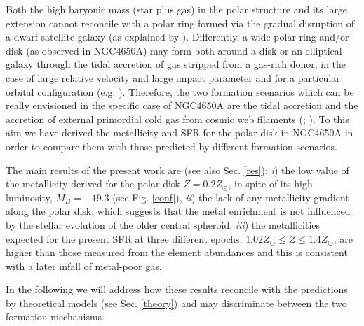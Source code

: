\documentclass[12pt,preprint]{aastex}
\begin{document}
 Both the high baryonic mass (star plus gas) in the polar structure
 and its large extension cannot reconcile with a polar ring formed via
 the gradual disruption of a dwarf satellite galaxy (as explained by
 \citealt{Iod02}).  Differently, a wide polar ring and/or disk (as
 observed in NGC4650A) may form both around a disk or an elliptical
 galaxy through the tidal accretion of gas stripped from a gas-rich
 donor, in the case of large relative velocity and large impact
 parameter and for a particular orbital configuration
 (e.g. \citealt{Bou03}).  Therefore, the two formation scenarios which
 can be really envisioned in the specific case of NGC4650A are the
 tidal accretion and the accretion of external primordial cold gas
 from cosmic web filaments (\citealt{Mac06}; \citealt{Bro08}). To this
 aim we have derived the metallicity and SFR for the polar disk in
 NGC4650A in order to compare them with those predicted by different
 formation scenarios.

The main results of the
  present work are (see also Sec. \ref{res}): \emph{i}) the low value
  of the metallicity derived for the polar disk $Z = 0.2Z_{\odot}$, in
  spite of its high luminosity, $M_{B} = -19.3$ (see Fig. \ref{conf}),
  \emph{ii}) the lack of any metallicity gradient along the polar
  disk, which suggests that the metal enrichment is not influenced by
  the stellar evolution of the older central spheroid, \emph{iii}) the
  metallicities expected for the present SFR at three different
  epochs, $1.02 Z_{\odot} \le Z \le 1.4 Z_{\odot}$, are higher than
  those measured from the element abundances and this is consistent
  with a later infall of metal-poor gas.

In the following we will address how these results reconcile with the
predictions by theoretical models (see Sec. \ref{theory}) and may
discriminate between the two formation mechanisms.
\end{document}

